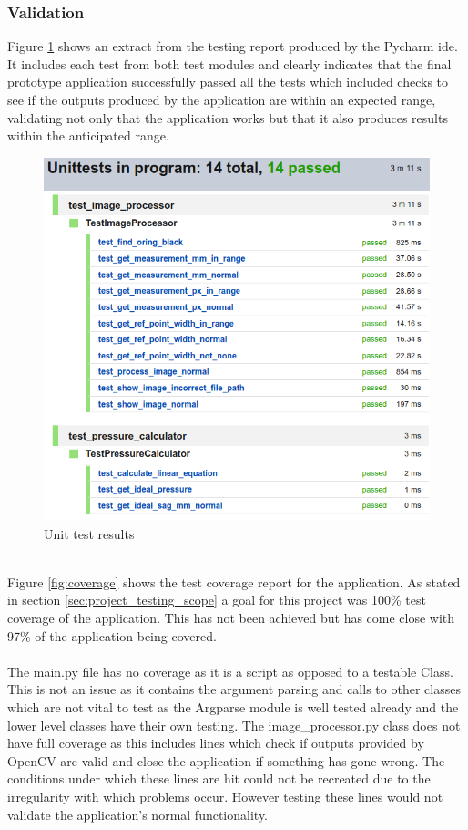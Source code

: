 		\subsubsection{Validation}
			Figure \ref{fig:test_results} shows an extract from the testing report produced by the Pycharm \gls{ide}. It includes each test from both test modules and clearly indicates that the final prototype application successfully passed all the tests which  included checks to see if the outputs produced by the application are within an expected range, validating not only that the application works but that it also produces  results within the anticipated range.
			\begin{figure}[h!]
				\centering
				\includegraphics[scale=0.5]{../images/results/test_results.png}
				\caption{Unit test results}
				\label{fig:test_results}
			\end{figure}\\
			Figure \ref{fig:coverage} shows the test coverage report for the application. As stated in section \ref{sec:project_testing_scope} a goal for this project was 100\% test coverage of the application. This has not been achieved but has come close with 97\% of the application being covered. 
			\\\\
			The main.py file has no coverage as it is a script as opposed to a testable Class. This is not an issue as it contains the argument parsing and calls to other classes which are not vital to test as the Argparse module is well tested already and the lower level classes have their own testing. The image\_processor.py class does not have full coverage as this includes lines which check if outputs provided by OpenCV are valid and close the application if something has gone wrong. The conditions under which these lines are hit could not be recreated due to the irregularity with which problems occur. However testing these lines would not validate the application’s normal functionality.
